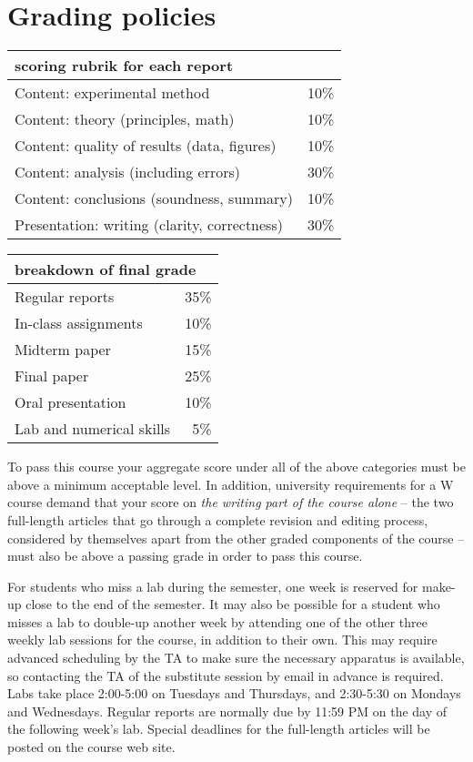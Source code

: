 \documentclass{revtex4}
\begin{document}
\section{Grading policies}

\hspace*{2cm}
\begin{tabular}{lr}
\multicolumn{2}{l}{scoring rubrik for each report} \\
\hline
Content: experimental method & 10\% \\
Content: theory (principles, math) & 10\% \\
Content: quality of results (data, figures) & 10\% \\
Content: analysis (including errors) & 30\% \\
Content: conclusions (soundness, summary) & 10\% \\
Presentation: writing (clarity, correctness) & 30\% \\
\hline
\end{tabular}
\hspace{1cm}
\begin{tabular}{lr}
\multicolumn{2}{l}{breakdown of final grade} \\
\hline
Regular reports & 35\% \\
In-class assignments & 10\% \\
Midterm paper & 15\% \\
Final paper & 25\% \\
Oral presentation & 10\% \\
Lab and numerical skills & 5\% \\
\hline
\end{tabular}
\vspace{1cm}

To pass this course your aggregate score under all of the above categories
must be above a minimum acceptable level. In addition, university requirements
for a W course demand that your score on {\it the writing part of the course
alone} -- the two full-length articles that go through a complete revision
and editing process, considered by themselves apart from the other graded
components of the course -- must also be above a passing grade in order to
pass this course.

For students who miss a lab during the semester, one week is reserved for
make-up close to the end of the semester. It may also be possible for a
student who misses a lab to double-up another week by attending one of the
other three weekly lab sessions for the course, in addition to their own.
This may require advanced scheduling by the TA to make sure the necessary
apparatus is available, so contacting the TA of the substitute session by
email in advance is required. Labs take place 2:00-5:00 on Tuesdays and
Thursdays, and 2:30-5:30 on Mondays and Wednesdays. Regular reports are
normally due by 11:59 PM on the day of the following week's lab. Special
deadlines for the full-length articles will be posted on the course web site.
\end{document}
